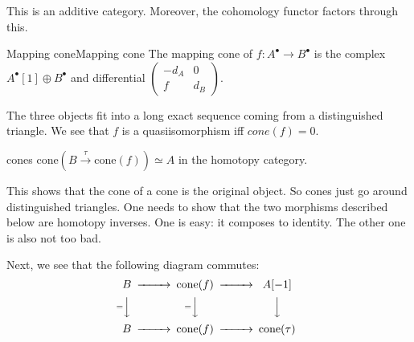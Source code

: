 This is an additive category. Moreover, the cohomology functor factors through this.

\begin{definition}{Mapping cone}{Mapping cone}
    The mapping cone of $f:A^\bullet\xrightarrow{}B^\bullet$ is the complex $A^\bullet[1]\oplus B^\bullet$ and differential $\begin{pmatrix} -d_A & 0 \\ f & d_B
\end{pmatrix}$.\end{definition}

The three objects fit into a long exact sequence coming from a distinguished triangle. We see that $f$ is a quasiisomorphism iff $cone(f)=0$. 

\begin{proposition}{}{cones}
    $\mathrm{cone}(B\xrightarrow{\tau} \mathrm{cone}(f))\simeq A$ in the homotopy category.
\end{proposition}

This shows that the cone of a cone is the original object. So cones just go around distinguished triangles. One needs to show that the two morphisms described below are homotopy inverses. One is easy: it composes to identity. The other one is also not too bad.


Next, we see that the following diagram commutes:$$\begin{CD} B @> > > \mathrm{cone}(f)@> > > A[-1] \\ @V=VV @V=VV @VVV\\B @> > > \mathrm{cone}(f) @> > > \mathrm{cone(\tau)}\end{CD}$$

